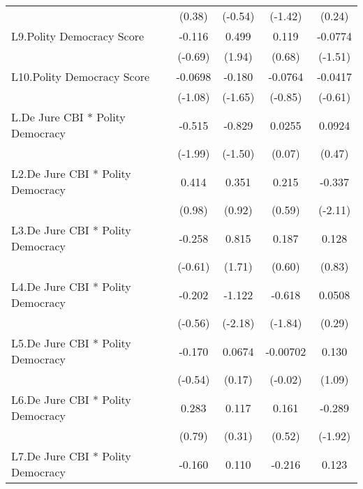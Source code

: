 {\begin{longtable}{l*{4}{c}}
                &   (0.38)         &  (-0.54)         &  (-1.42)         &   (0.24)         \\
[1em]
L9.Polity Democracy Score&   -0.116         &    0.499         &    0.119         &  -0.0774         \\
                &  (-0.69)         &   (1.94)         &   (0.68)         &  (-1.51)         \\
[1em]
L10.Polity Democracy Score&  -0.0698         &   -0.180         &  -0.0764         &  -0.0417         \\
                &  (-1.08)         &  (-1.65)         &  (-0.85)         &  (-0.61)         \\
[1em]
L.De Jure CBI * Polity Democracy&   -0.515\sym{*}  &   -0.829         &   0.0255         &   0.0924         \\
                &  (-1.99)         &  (-1.50)         &   (0.07)         &   (0.47)         \\
[1em]
L2.De Jure CBI * Polity Democracy&    0.414         &    0.351         &    0.215         &   -0.337\sym{*}  \\
                &   (0.98)         &   (0.92)         &   (0.59)         &  (-2.11)         \\
[1em]
L3.De Jure CBI * Polity Democracy&   -0.258         &    0.815         &    0.187         &    0.128         \\
                &  (-0.61)         &   (1.71)         &   (0.60)         &   (0.83)         \\
[1em]
L4.De Jure CBI * Polity Democracy&   -0.202         &   -1.122\sym{*}  &   -0.618         &   0.0508         \\
                &  (-0.56)         &  (-2.18)         &  (-1.84)         &   (0.29)         \\
[1em]
L5.De Jure CBI * Polity Democracy&   -0.170         &   0.0674         & -0.00702         &    0.130         \\
                &  (-0.54)         &   (0.17)         &  (-0.02)         &   (1.09)         \\
[1em]
L6.De Jure CBI * Polity Democracy&    0.283         &    0.117         &    0.161         &   -0.289         \\
                &   (0.79)         &   (0.31)         &   (0.52)         &  (-1.92)         \\
[1em]
L7.De Jure CBI * Polity Democracy&   -0.160         &    0.110         &   -0.216         &    0.123         \\

\end{longtable}}

